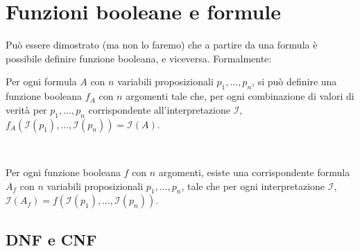 \section{Funzioni booleane e formule}
Può essere dimostrato (ma non lo faremo) che a partire da una formula è possibile definire 
funzione booleana, e viceversa. Formalmente:\smallskip\\
\colorbox{SALZO}{\parbox{\dimexpr\linewidth-2\fboxsep}{\begin{definition}
   Per ogni formula $A$ con $n$ variabili proposizionali $p_1, \dots, p_n$, si può definire una funzione booleana $f_A$ con $n$ argomenti tale che, per ogni combinazione di valori di verità per $p_1, \dots, p_n$ corrispondente all'interpretazione $\mathcal{I}$,
$f_A(\mathcal{I}(p_1), \dots, \mathcal{I}(p_n)) = \mathcal{I}(A)$.
\end{definition}}}\smallskip\\
\colorbox{SALZO}{\parbox{\dimexpr\linewidth-2\fboxsep}{\begin{definition}
   Per ogni funzione booleana $f$ con $n$ argomenti, esiste una corrispondente formula $A_f$ con $n$ variabili proposizionali $p_1, \dots, p_n$, tale che per ogni interpretazione $\mathcal{I}$, $\mathcal{I}(A_f) = f(\mathcal{I}(p_1), \dots, \mathcal{I}(p_n))$.
\end{definition}}}

\subsection{DNF e CNF}

